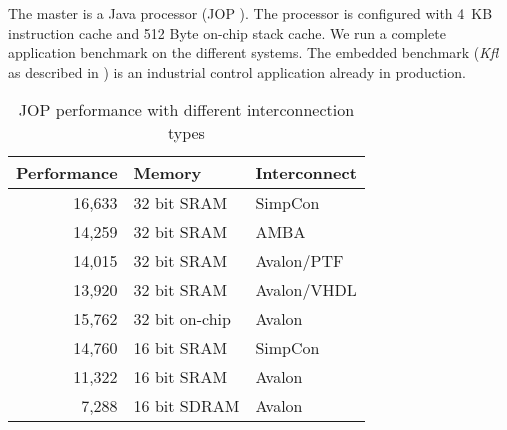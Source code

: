The master is a Java processor (JOP \cite{jop:thesis,
jop:jnl:jsa2007}). The processor is configured with 4~KB instruction
cache and 512 Byte on-chip stack cache. We run a complete
application benchmark on the different systems. The embedded
benchmark (\emph{Kfl} as described in \cite{jop:austrochip05}) is an
industrial control application already in production.



\begin{table}
    \centering

    \begin{tabular}{rll}
        \toprule
        Performance &      Memory     & Interconnect \\
        \midrule
        16,633 &  32 bit SRAM & SimpCon \\

        14,259 &  32 bit SRAM & AMBA \\

        14,015 &  32 bit SRAM & Avalon/PTF \\
        13,920 &  32 bit SRAM & Avalon/VHDL \\
        15,762 & 32 bit on-chip & Avalon\\

        14,760 &  16 bit SRAM & SimpCon \\

        11,322 &  16 bit SRAM & Avalon \\


         7,288  & 16 bit SDRAM & Avalon \\


%
%
%
%
%


        \bottomrule

    \end{tabular}
    \caption{JOP performance with different interconnection types}
    \label{tab:perf:diff}


\end{table}

